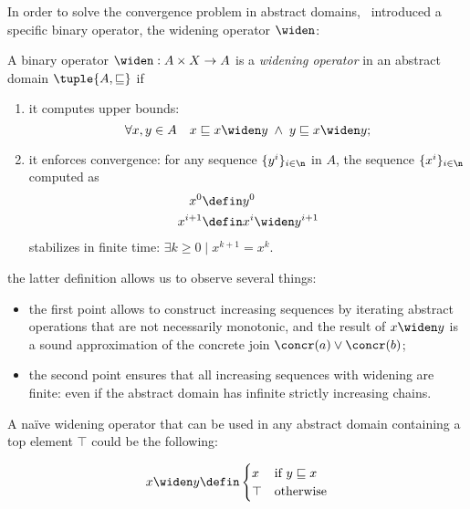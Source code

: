 
In order to solve the convergence problem in abstract
domains,~\cite{patrickradhia:one} introduced a specific binary
operator, the widening operator \(\widen\):

\begin{definition}
  A binary operator \(\widen : A \times X \to A\) is a \emph{widening
    operator} in an abstract domain \(\tuple{A, \sqsubseteq}\) if
  \begin{enumerate}
  \item it computes upper bounds:
    \begin{equation*}
      \forall x, y \in A \quad x \sqsubseteq x \widen y \; \land \; y \sqsubseteq x \widen y;
    \end{equation*}
  \item it enforces convergence: for any sequence \(\{y^i\}_{i\in\n}\)
    in \(A\), the sequence \(\{x^i\}_{i\in\n}\) computed as
    \begin{align*}
      x^0 & \defin y^0 \\
      x^{i+1} & \defin x^i \widen y^{i+1}
    \end{align*}
    stabilizes in finite time: \(\exists k \geq 0 \mid x^{k+1} = x^k\).
  \end{enumerate}
\end{definition}

the latter definition allows us to observe several things:
\begin{itemize}
\item the first point allows to construct increasing sequences by
  iterating abstract operations that are not necessarily monotonic, and
  the result of \(x \widen y\) is a sound approximation of the
  concrete join \(\concr(a) \vee \concr(b)\);
\item the second point ensures that all increasing sequences with
  widening are finite: even if the abstract domain has infinite
  strictly increasing chains.
\end{itemize}

A naïve widening operator that can be used in any abstract domain
containing a top element \(\top\) could be the following:

\begin{example}
  \begin{equation*}
    x \widen y \defin \begin{cases}
      x & \text{if } y \sqsubseteq x \\
      \top & \text{otherwise}
    \end{cases}
  \end{equation*}
\end{example}

